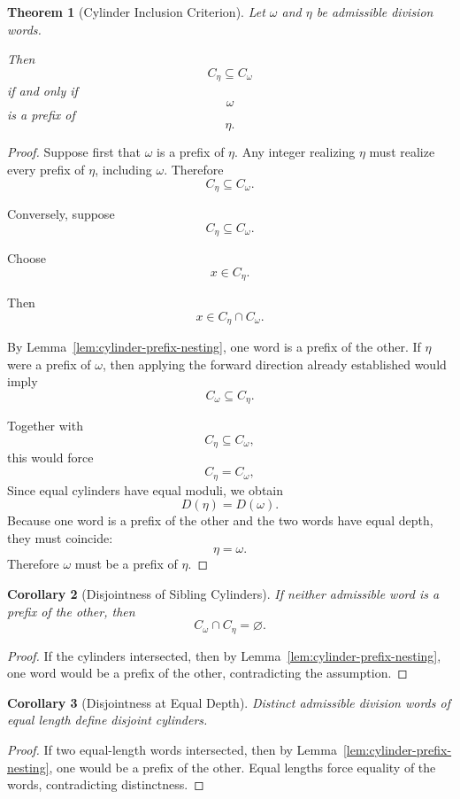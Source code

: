 \documentclass[12pt, oneside]{article}
\numberwithin{equation}{section}
\theoremstyle{definition}
\theoremstyle{plain}
\newtheorem{theorem}{Theorem}[section]
\newtheorem{corollary}[theorem]{Corollary}
\theoremstyle{remark}
\begin{document}
\begin{theorem}[Cylinder Inclusion Criterion]
\label{thm:cylinder-inclusion}
Let $\omega$ and $\eta$ be admissible division words.

Then
\[
C_\eta\subseteq C_\omega
\]
if and only if
\[
\omega
\]
is a prefix of
\[
\eta.
\]
\end{theorem}

\begin{proof}
Suppose first that $\omega$ is a prefix of $\eta$.
Any integer realizing $\eta$ must realize every prefix of $\eta$,
including $\omega$. Therefore
\[
C_\eta\subseteq C_\omega.
\]

Conversely, suppose
\[
C_\eta\subseteq C_\omega.
\]

Choose
\[
x\in C_\eta.
\]

Then
\[
x\in C_\eta\cap C_\omega.
\]

By Lemma~\ref{lem:cylinder-prefix-nesting}, one word is a prefix
of the other. If $\eta$ were a prefix of $\omega$, then applying
the forward direction already established would imply
\[
C_\omega\subseteq C_\eta.
\]

Together with
\[
C_\eta\subseteq C_\omega,
\]
this would force
\[
C_\eta=C_\omega,
\]
Since equal cylinders have equal moduli, we obtain
\[
D(\eta)=D(\omega).
\]
Because one word is a prefix of the other and the two words have equal
depth, they must coincide:
\[
\eta=\omega.
\]
Therefore $\omega$ must be a prefix of $\eta$.
\end{proof}

\begin{corollary}[Disjointness of Sibling Cylinders]
\label{cor:sibling-disjointness}
If neither admissible word is a prefix of the other, then
\[
C_\omega\cap C_\eta=\varnothing.
\]
\end{corollary}

\begin{proof}
If the cylinders intersected, then by
Lemma~\ref{lem:cylinder-prefix-nesting},
one word would be a prefix of the other, contradicting the assumption.
\end{proof}

\begin{corollary}[Disjointness at Equal Depth]
\label{cor:equal-depth-disjoint}
Distinct admissible division words of equal length define disjoint
cylinders.
\end{corollary}

\begin{proof}
If two equal-length words intersected, then by
Lemma~\ref{lem:cylinder-prefix-nesting},
one would be a prefix of the other.
Equal lengths force equality of the words, contradicting distinctness.
\end{proof}
\end{document}

